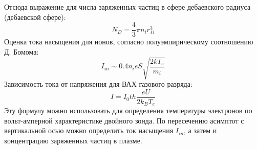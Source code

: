 \documentclass[a4paper, 12pt]{article}
\begin{document}
Отсюда выражение для числа заряженных частиц в сфере дебаевского радиуса (дебаевской сфере):
\begin{equation}
    N_{D} = \frac{4}{3}\pi n_{i}r^3_{D}
    \label{число заряженных частиц в дебаевской сфере}
\end{equation}
Оценка тока насыщения для ионов, согласно полуэмпирическому соотношению Д. Бомома:
\begin{equation}
    I_{in} \sim 0.4n_{i}eS\sqrt{\frac{2kT_{e}}{m_{i}}}
    \label{ток насыщения}
\end{equation}
Зависимость тока от напряжения для ВАХ газового разряда:
\begin{equation}
    I = I_{0}th\frac{eU}{2k_{B}T_{e}}
    \label{зависимость тока от напряжения для двойного зонда}
\end{equation}
Эту формулу можно использовать для определения температуры электронов по вольт-амперной характеристике двойного зонда.
По пересечению асимптот с вертикальной осью можно определить ток насыщения $I_{in}$, а затем и концентрацию заряженных частиц в плазме.
\newpage
\end{document}
